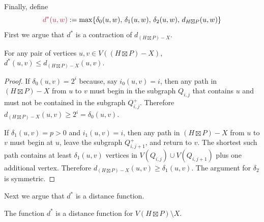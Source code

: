 \documentclass{patmorin}
\makeatletter
\renewcommand{\ge}{\geqslant}
\renewcommand{\le}{\leqslant}
\def\mathcolor#1#{\@mathcolor{#1}}
\def\@mathcolor#1#2#3{%
  \protect\leavevmode
  \begingroup
    \color#1{#2}#3%
  \endgroup
}
\newcommand{\mathdefin}[1]{\mathcolor{brightmaroon}{#1}}
\makeatother
\begin{document}


Finally, define
\[
  \mathdefin{d^*(u,w)} := \max\{\delta_0(u,w),\, \delta_1(u,w),\, \delta_2(u,w),\, d_{H\boxtimes P}(u,w) \}
\]
First we argue that $d^*$ is a contraction of $d_{(H\boxtimes P)-X}$.
\begin{lem}\label{d_star_contraction}
  For any pair of vertices $u,v\in V((H\boxtimes P)-X)$, $d^*(u,v)\le d_{(H\boxtimes P)-X}(u,v)$.
\end{lem}

\begin{proof}
  If $\delta_0(u,v)=2^i$ because, say $i_0(u,v)=i$, then any path in $(H\boxtimes P)-X$ from $u$ to $v$ must begin in the subgraph $Q_{i,j}$ that contains $u$ and must not be contained in the subgraph $Q^+_{i,j}$.  Therefore $d_{(H\boxtimes P)-X}(u,v) \ge 2^i=\delta_0(u,v)$.

  If $\delta_1(u,v)=p>0$ and $i_1(u,v)=i$, then any path in $(H\boxtimes P)-X$ from $u$ to $v$ must begin at $u$, leave the subgraph $Q^+_{i,j+1}$, and return to $v$.  The shortest such path contains at least $\delta_1(u,v)$ vertices in $V(Q_{i,j})\cup V(Q_{i,j+1})$ plus one additional vertex.  Therefore $d_{(H\boxtimes P)-X}(u,v) \ge \delta_1(u,v)$.  The argument for $\delta_2$ is symmetric.
\end{proof}

Next we argue that $d^*$ is a distance function.

\begin{lem}\label{d_star_metric}
  The function $d^*$ is a distance function for $V(H\boxtimes P)\setminus X$.
\end{lem}
\end{document}
